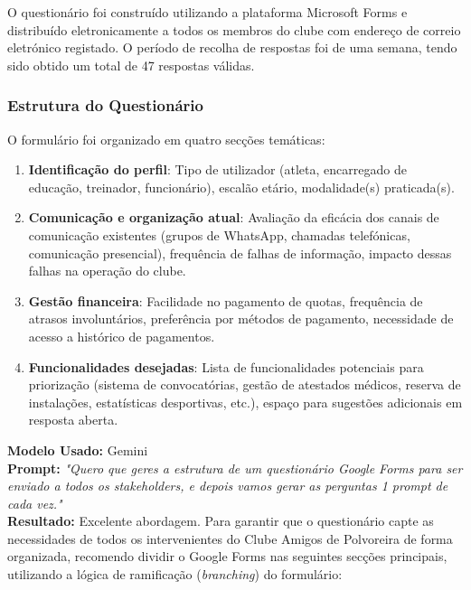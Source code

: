 \documentclass[a4paper,12pt]{scrreprt}
\newcommand{\caixaprompt}[3]{
    \begin{tcolorbox}[
        enhanced,
        colback=azulclaro,      %
        colframe=blue!50!black, %
        arc=2mm,                %
        boxrule=0.5mm,          %
        title=\textbf{Documentação de IA}, %
        fonttitle=\sffamily,
        coltitle=black,
        attach title to upper,
        after title={\par\medskip},
    ]
        \textbf{Modelo Usado:} #1 \\
        \textbf{Prompt:} \textit{"#2"} \\
        \tcbline %
        \textbf{Resultado:} #3
    \end{tcolorbox}
}
\begin{document}
{O questionário foi construído utilizando a plataforma Microsoft Forms e distribuído eletronicamente a todos os membros do clube com endereço de correio eletrónico registado. O período de recolha de respostas foi de uma semana, tendo sido obtido um total de 47 respostas válidas.

\subsubsection{Estrutura do Questionário}

O formulário foi organizado em quatro secções temáticas:

\begin{enumerate}
    \item \textbf{Identificação do perfil}: Tipo de utilizador (atleta, encarregado de educação, treinador, funcionário), escalão etário, modalidade(s) praticada(s).

    \item \textbf{Comunicação e organização atual}: Avaliação da eficácia dos canais de comunicação existentes (grupos de WhatsApp, chamadas telefónicas, comunicação presencial), frequência de falhas de informação, impacto dessas falhas na operação do clube.

    \item \textbf{Gestão financeira}: Facilidade no pagamento de quotas, frequência de atrasos involuntários, preferência por métodos de pagamento, necessidade de acesso a histórico de pagamentos.

    \item \textbf{Funcionalidades desejadas}: Lista de funcionalidades potenciais para priorização (sistema de convocatórias, gestão de atestados médicos, reserva de instalações, estatísticas desportivas, etc.), espaço para sugestões adicionais em resposta aberta.
\end{enumerate}

\caixaprompt{Gemini}{Quero que geres a estrutura de um questionário Google Forms para ser enviado a todos os stakeholders, e depois vamos gerar as perguntas 1 prompt de cada vez.}{Excelente abordagem. Para garantir que o questionário capte as necessidades de todos os intervenientes do Clube Amigos de Polvoreira de forma organizada, recomendo dividir o Google Forms nas seguintes secções principais, utilizando a lógica de ramificação (\textit{branching}) do formulário:

}}
\end{document}

